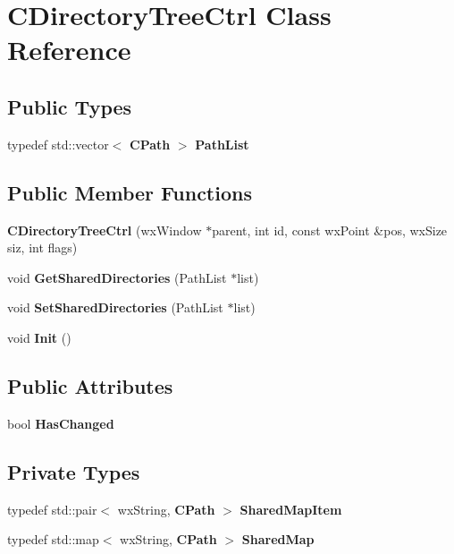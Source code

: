 \section{CDirectoryTreeCtrl Class Reference}
\label{classCDirectoryTreeCtrl}
\subsection*{Public Types}
\begin{DoxyCompactItemize}
\item 
typedef std::vector$<$ {\bf CPath} $>$ {\bfseries PathList}\label{classCDirectoryTreeCtrl_a9b82edebb70022eb331676f5f8c94d6e}

\end{DoxyCompactItemize}
\subsection*{Public Member Functions}
\begin{DoxyCompactItemize}
\item 
{\bfseries CDirectoryTreeCtrl} (wxWindow $\ast$parent, int id, const wxPoint \&pos, wxSize siz, int flags)\label{classCDirectoryTreeCtrl_abf7f5c449e4fb265cc2e28a5cf4ece1b}

\item 
void {\bfseries GetSharedDirectories} (PathList $\ast$list)\label{classCDirectoryTreeCtrl_a214c891eb774abb666ef82c8ad42ccf9}

\item 
void {\bfseries SetSharedDirectories} (PathList $\ast$list)\label{classCDirectoryTreeCtrl_aadab5167e29e02d9b5ca734e9781891f}

\item 
void {\bfseries Init} ()\label{classCDirectoryTreeCtrl_a538bb22302757bb7e453377a1a24a94f}

\end{DoxyCompactItemize}
\subsection*{Public Attributes}
\begin{DoxyCompactItemize}
\item 
bool {\bfseries HasChanged}\label{classCDirectoryTreeCtrl_a5e980c02d6f39c7f64a78c134821db6d}

\end{DoxyCompactItemize}
\subsection*{Private Types}
\begin{DoxyCompactItemize}
\item 
typedef std::pair$<$ wxString, {\bf CPath} $>$ {\bfseries SharedMapItem}\label{classCDirectoryTreeCtrl_af0371c02410d41acf2620fda82a71cca}

\item 
typedef std::map$<$ wxString, {\bf CPath} $>$ {\bfseries SharedMap}\label{classCDirectoryTreeCtrl_a869e1589d1eee58bfb52ec8e6c95e350}

\end{DoxyCompactItemize}
